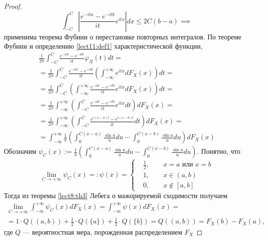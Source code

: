         \begin{proof}
            \begin{equation*}
                \int_{-C}^{C}\left| \frac{e^{-ita} - e^{-itb}}{it} e^{itx}\right|dx \leq 2C (b-a) \implies
            \end{equation*}
            применима теорема Фубини о перестановке повторных интегралов.
            По теореме Фубини и определению \ref{lect11:def1} характеристической функции,
            \begin{multline*}
                \frac{1}{2\pi}\int_{-C}^{C} \frac{e^{-iat} - e^{-ibt}}{it} \varphi_X(t)dt =\\= \frac{1}{2\pi}\int_{-C}^{C} \frac{e^{-iat} - e^{-ibt}}{it} \left(\int_{-\infty}^{+\infty}e^{itx}dF_X(x)\right)dt =\\= \frac{1}{2\pi}\int_{-C}^{C} \left(\int_{-\infty}^{+\infty}\frac{e^{-iat} - e^{-ibt}}{it}e^{itx} dF_X(x)\right)dt=\\
                =\frac{1}{2\pi}\int_{-\infty}^{+\infty}  \left(\int_{-C}^{C}\frac{e^{-iat} - e^{-ibt}}{it}e^{itx}dt\right)dF_X(x)=\\=
                \frac{1}{2\pi}\int_{-\infty}^{+\infty}  \left(\int_{-C}^{C}\frac{e^{i(x-a)t} - e^{i(x-b)t}}{it}dt\right)dF_X(x)=\\=
                \int_{-\infty}^{+\infty} \frac{1}{\pi}\left(\int_{0}^{C(x-a)} \frac{\sin u}{u}du -\int_{0}^{C(x-b)} \frac{\sin u}{u}du\right) dF_X(x)
            \end{multline*}
            Обозначим $\psi_C(x) := \frac{1}{\pi}\left(\int_{0}^{C(x-a)} \frac{\sin u}{u}du -\int_{0}^{C(x-b)} \frac{\sin u}{u}du\right)$. Понятно, что
            \begin{equation*}
                \lim_{C\to +\infty}\psi_C(x) =: \psi(x) = \left\{
                    \begin{aligned}
                    &\tfrac{1}{2}, \qquad x = a \text{ или } x = b \\
                    & 1, \qquad x\in \left(a, b\right)\\
                    & 0, \qquad x\notin \left[a, b\right] 
                \end{aligned}\right.
            \end{equation*}
            Тогда из теоремы \ref{lect8:th3} Лебега о мажорируемой сходимости получаем
            \begin{multline*}
                \lim_{C\to +\infty}\int_{-\infty}^{+\infty} \psi_C(x)dF_X(x) = \int_{-\infty}^{+\infty} \psi(x)dF_X(x) = \\ = 1 \cdot Q(\left(a, b\right)) + \tfrac{1}{2} \cdot Q(\{a\})+\tfrac{1}{2} \cdot Q(\{b\}) = Q(\left(a, b\right)) = F_X(b)-F_X(a),
            \end{multline*}
            где $Q$ --- вероятностная мера, порожденная распределением $F_X$
        \end{proof}